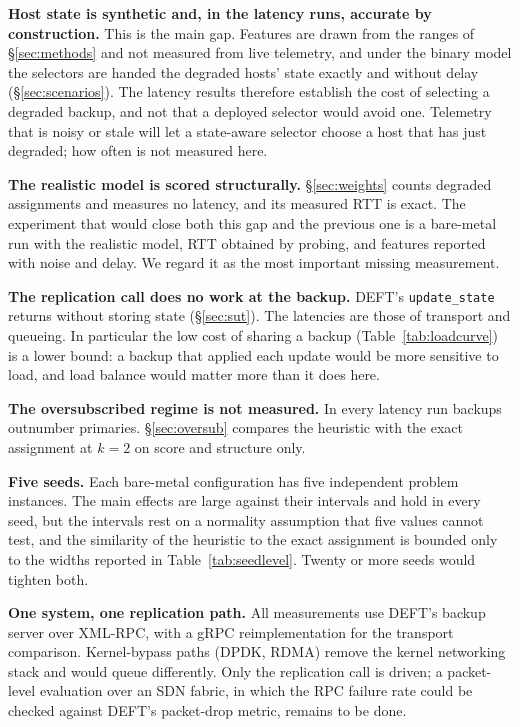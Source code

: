 \documentclass[journal]{IEEEtran}
\begin{document}
\textbf{Host state is synthetic and, in the latency runs, accurate by
construction.} This is the main gap. Features are drawn from the ranges of
\S\ref{sec:methods} and not measured from live telemetry, and under the binary
model the selectors are handed the degraded hosts' state exactly and without
delay (\S\ref{sec:scenarios}). The latency results therefore establish the cost
of selecting a degraded backup, and not that a deployed selector would avoid
one. Telemetry that is noisy or stale will let a state-aware selector choose a
host that has just degraded; how often is not measured here.

\textbf{The realistic model is scored structurally.} \S\ref{sec:weights} counts
degraded assignments and measures no latency, and its measured RTT is exact.
The experiment that would close both this gap and the previous one is a
bare-metal run with the realistic model, RTT obtained by probing, and features
reported with noise and delay. We regard it as the most important missing
measurement.

\textbf{The replication call does no work at the backup.} DEFT's
\texttt{update\_state} returns without storing state (\S\ref{sec:sut}). The
latencies are those of transport and queueing. In particular the low cost of
sharing a backup (Table~\ref{tab:loadcurve}) is a lower bound: a backup that
applied each update would be more sensitive to load, and load balance would
matter more than it does here.

\textbf{The oversubscribed regime is not measured.} In every latency run backups
outnumber primaries. \S\ref{sec:oversub} compares the heuristic with the exact
assignment at $k = 2$ on score and structure only.

\textbf{Five seeds.} Each bare-metal configuration has five independent problem
instances. The main effects are large against their intervals and hold in every
seed, but the intervals rest on a normality assumption that five values cannot
test, and the similarity of the heuristic to the exact assignment is bounded
only to the widths reported in Table~\ref{tab:seedlevel}. Twenty or more seeds
would tighten both.

\textbf{One system, one replication path.} All measurements use DEFT's backup
server over XML-RPC, with a gRPC reimplementation for the transport comparison.
Kernel-bypass paths (DPDK, RDMA) remove the kernel networking stack and would
queue differently. Only the replication call is driven; a packet-level
evaluation over an SDN fabric, in which the RPC failure rate could be checked
against DEFT's packet-drop metric, remains to be done.
\end{document}
